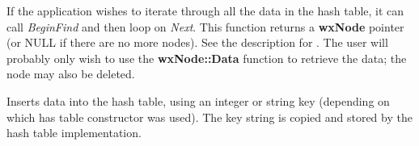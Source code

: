 If the application wishes to iterate through all the data in the hash
table, it can call {\it BeginFind} and then loop on {\it Next}. This function
returns a {\bf wxNode} pointer (or NULL if there are no more nodes).  See the
description for . The user will probably only wish to use the
{\bf wxNode::Data} function to retrieve the data; the node may also be deleted.




Inserts data into the hash table, using an integer or string key (depending on which
has table constructor was used). The key string is copied and stored by the hash
table implementation.


